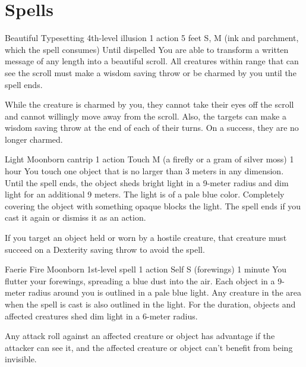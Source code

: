 \chapter{Spells}
\DndSpellHeader%
    {Beautiful Typesetting}
    {4th-level illusion}
    {1 action}
    {5 feet}
    {S, M (ink and parchment, which the spell consumes)}
    {Until dispelled}
You are able to transform a written message of any length into a beautiful scroll. All creatures within range that can see the scroll must make a wisdom saving throw or be charmed by you until the spell ends.

While the creature is charmed by you, they cannot take their eyes off the scroll and cannot willingly move away from the scroll. Also, the targets can make a wisdom saving throw at the end of each of their turns. On a success, they are no longer charmed.

\DndSpellHeader %
    {Light \label{spell::light}}
    {Moonborn cantrip}
    {1 action}
    {Touch}
    {M (a firefly or a gram of silver moss)}
    {1 hour}
You touch one object that is no larger than 3 meters in any dimension.
Until the spell ends, the object sheds bright light in a 9-meter radius and dim light for an additional 9 meters.
The light is of a pale blue color.
Completely covering the object with something opaque blocks the light.
The spell ends if you cast it again or dismiss it as an action.

If you target an object held or worn by a hostile creature, that creature must succeed on a Dexterity saving throw to avoid the spell.

\DndSpellHeader %
    {Faerie Fire \label{spell::faeriefire}}
    {Moonborn 1st-level spell}
    {1 action}
    {Self}
    {S (forewings)}
    {1 minute}
You flutter your forewings, spreading a blue dust into the air.
Each object in a 9-meter radius around you is outlined in a pale blue light.
Any creature in the area when the spell is cast is also outlined in the light.
For the duration, objects and affected creatures shed dim light in a 6-meter radius.

Any attack roll against an affected creature or object has advantage if the attacker can see it, and the affected creature or object can't benefit from being invisible.

